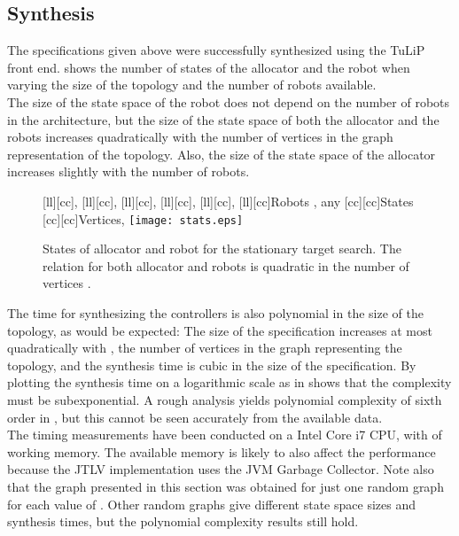 \subsection{Synthesis} 

The specifications given above were successfully synthesized using the TuLiP front end.  shows the number of states of the allocator and the robot when varying the size of the topology and the number of robots available.\\

The size of the state space of the robot does not depend on the number of robots in the architecture, but the size of the state space of both the allocator and the robots increases quadratically with the number of vertices in the graph representation of the topology. Also, the size of the state space of the allocator increases slightly with the number of robots.\\

\begin{figure}
\centering
	[ll][cc]{\footnotesize{, }}
	[ll][cc]{\footnotesize{, }}
	[ll][cc]{\footnotesize{, }}
	[ll][cc]{\footnotesize{, }}
	[ll][cc]{\footnotesize{, }}
	[ll][cc]{\footnotesize{Robots , any }}
	[cc][cc]{\footnotesize{States}}
	[cc][cc]{\footnotesize{Vertices, }}
	\texttt{[image: stats.eps]}
\caption{States of allocator and robot for the stationary target search. The relation for both allocator  and robots  is quadratic in the number of vertices .}
\label{fig:statstates}
\end{figure}

The time for synthesizing the controllers is also polynomial in the size of the topology, as would be expected: The size of the specification increases at most quadratically with , the number of vertices in the graph representing the topology, and the synthesis time is cubic in the size of the specification. By plotting the synthesis time on a logarithmic scale as in  shows that the complexity must be subexponential. A rough analysis yields polynomial complexity of sixth order in , but this cannot be seen accurately from the available data.\\

The timing measurements have been conducted on a  Intel Core i7 CPU, with  of working memory. The available memory is likely to also affect the performance because the JTLV implementation uses the JVM Garbage Collector. Note also that the graph presented in this section was obtained for just one random graph for each value of . Other random graphs give different state space sizes and synthesis times, but the polynomial complexity results still hold.\\

